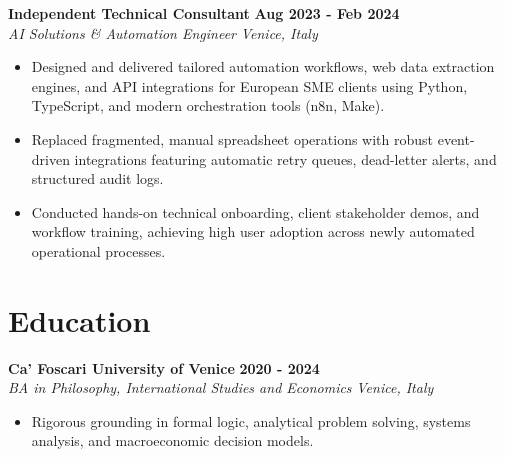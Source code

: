 \documentclass[10pt,a4paper]{article}
\newcommand{\role}[4]{%
  \textbf{#1} \hfill \textbf{#2}\\[1pt]%
  \textit{#3} \hfill \textit{#4}\\[2pt]%
}
\begin{document}
\role{Independent Technical Consultant}{Aug 2023 - Feb 2024}{AI Solutions \& Automation Engineer}{Venice, Italy}
\begin{itemize}
  \item Designed and delivered tailored automation workflows, web data extraction engines, and API integrations for European SME clients using Python, TypeScript, and modern orchestration tools (n8n, Make).
  \item Replaced fragmented, manual spreadsheet operations with robust event-driven integrations featuring automatic retry queues, dead-letter alerts, and structured audit logs.
  \item Conducted hands-on technical onboarding, client stakeholder demos, and workflow training, achieving high user adoption across newly automated operational processes.
\end{itemize}

\section{Education}
\role{Ca' Foscari University of Venice}{2020 - 2024}{BA in Philosophy, International Studies and Economics}{Venice, Italy}
\begin{itemize}
  \item Rigorous grounding in formal logic, analytical problem solving, systems analysis, and macroeconomic decision models.
\end{itemize}
\end{document}

